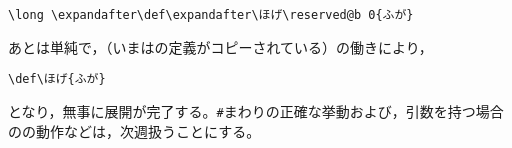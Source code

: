 \documentclass[autodetect-engine,dvipdfmx]{jsarticle}
\begin{document}
\begin{lstlisting}
\long \expandafter\def\expandafter\ほげ\reserved@b 0{ふが}
\end{lstlisting}

あとは単純で，（いまはの定義がコピーされている）の働きにより，
\begin{lstlisting}
\def\ほげ{ふが}
\end{lstlisting}
となり，無事に展開が完了する。\texttt{\#}\preSub まわりの正確な挙動および，引数を持つ場合のの動作などは，次週扱うことにする。



%
%
%
%
%


\end{document}
